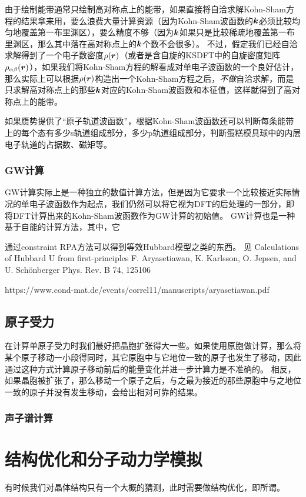 由于绘制能带通常只绘制高对称点上的能带，如果直接将自洽求解Kohn-Sham方程的结果拿来用，要么浪费大量计算资源（因为Kohn-Sham波函数的$\vb*{k}$必须比较均匀地覆盖第一布里渊区），要么精度不够（因为$\vb*{k}$如果只是比较稀疏地覆盖第一布里渊区，那么其中落在高对称点上的$\vb*{k}$个数不会很多）。
不过，假定我们已经自洽求解得到了一个电子数密度$\rho(\vb*{r})$（或者是含自旋的KSDFT中的自旋密度矩阵$\rho_{\alpha \beta}(\vb*{r})$），如果我们将Kohn-Sham方程的解看成对单电子波函数的一个良好估计，那么实际上可以根据$\rho(\vb*{r})$构造出一个Kohn-Sham方程之后，\emph{不做}自洽求解，而是只求解高对称点上的那些$\vb*{k}$对应的Kohn-Sham波函数和本征值，这样就得到了高对称点上的能带。

如果赝势提供了“原子轨道波函数”，根据Kohn-Sham波函数还可以判断每条能带上的每个态有多少s轨道组成部分，多少p轨道组成部分，判断蛋糕模具球中的内层电子轨道的占据数、磁矩等。

\subsubsection{GW计算}

GW计算实际上是一种独立的数值计算方法，但是因为它要求一个比较接近实际情况的单电子波函数作为起点，我们仍然可以将它视为DFT的后处理的一部分，即将DFT计算出来的Kohn-Sham波函数作为GW计算的初始值。
GW计算也是一种基于自能的计算方法，其中，它

通过constraint RPA方法可以得到等效Hubbard模型之类的东西。
见
Calculations of Hubbard U from first-principles
F. Aryasetiawan, K. Karlsson, O. Jepsen, and U. Schönberger
Phys. Rev. B 74, 125106 

https://www.cond-mat.de/events/correl11/manuscripts/aryasetiawan.pdf



\subsection{原子受力}



在计算单原子受力时我们最好把晶胞扩张得大一些。如果使用原胞做计算，那么将某个原子移动一小段得同时，其它原胞中与它地位一致的原子也发生了移动，因此通过这种方式计算原子移动前后的能量变化并进一步计算力是不准确的。
相反，如果晶胞被扩张了，那么移动一个原子之后，与之最为接近的那些原胞中与之地位一致的原子并没有发生移动，会给出相对可靠的结果。

\subsubsection{声子谱计算}

\section{结构优化和分子动力学模拟}

有时候我们对晶体结构只有一个大概的猜测，此时需要做结构优化，即所谓。


